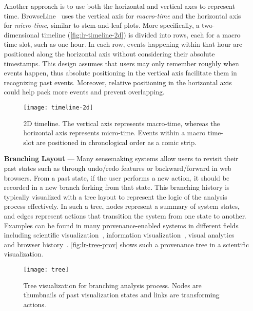 Another approach is to use both the horizontal and vertical axes to represent time. BrowseLine~\cite{Hoeber2009} uses the vertical axis for \emph{macro-time} and the horizontal axis for \emph{micro-time}, similar to stem-and-leaf plots. More specifically, a two-dimensional timeline (\autoref{fig:lr-timeline-2d}) is divided into rows, each for a macro time-slot, such as one hour. In each row, events happening within that hour are positioned along the horizontal axis without considering their absolute timestamps. This design assumes that users may only remember roughly when events happen, thus absolute positioning in the vertical axis facilitate them in recognizing past events. Moreover, relative positioning in the horizontal axis could help pack more events and prevent overlapping.

\begin{figure}
	\centering
	\texttt{[image: timeline-2d]}
	\caption[Two-dimensional timeline]{2D timeline. The vertical axis represents macro-time, whereas the horizontal axis represents micro-time. Events within a macro time-slot are positioned in chronological order as a comic strip. }
	\label{fig:lr-timeline-2d}
\end{figure}

\textbf{Branching Layout} --- Many sensemaking systems allow users to revisit their past states such as through undo/redo features or backward/forward in web browsers. From a past state, if the user performs a new action, it should be recorded in a new branch forking from that state. This branching history is typically visualized with a tree layout to represent the logic of the analysis process effectively. In such a tree, nodes represent a summary of system states, and edges represent actions that transition the system from one state to another. Examples can be found in many provenance-enabled systems in different fields including scientific visualization~\cite{Ma1999}, information visualization~\cite{Dunne2012}, visual analytics~\cite{Kadivar2009} and browser history~\cite{Ayers1995}. \autoref{fig:lr-tree-prov} shows such a provenance tree in a scientific visualization.

\begin{figure}
	\centering
	\texttt{[image: tree]}
	\caption[Tree visualization for branching analysis process]{Tree visualization for branching analysis process. Nodes are thumbnails of past visualization states and links are transforming actions. }
	\label{fig:lr-tree-prov}
\end{figure}

